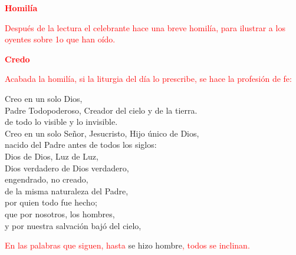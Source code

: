 \documentclass[12pt, letterpaper]{report}
\begin{document}
\Large {\bfseries \textcolor{red}{Homil\'ia}}

\large {\textcolor{red}{Despu\'es de la lectura el celebrante hace una breve homil\'ia, para ilustrar a los oyentes sobre 1o que han o\'ido.}}

\Large {\bfseries \textcolor{red}{Credo}}

\large {\textcolor{red}{Acabada la homil\'ia, si la liturgia del d\'ia lo prescribe, se hace la profesi\'on de fe:}}

\noindent
\Large {Creo en un solo Dios,\\
    Padre Todopoderoso, Creador del cielo y de la tierra.\\
    de todo lo visible y lo invisible.\\
    Creo en un solo Se\~nor, Jesucristo, Hijo \'unico de Dios,\\
    nacido del Padre antes de todos los siglos:\\
    Dios de Dios, Luz de Luz,\\
    Dios verdadero de Dios verdadero,\\
    engendrado, no creado,\\
    de la misma naturaleza del Padre,\\
    por quien todo fue hecho;\\
    que por nosotros, los hombres,\\
    y por nuestra salvaci\'on baj\'o del cielo,
}

\large {\textcolor{red}{En las palabras que siguen, hasta} se hizo hombre\textcolor{red}{, todos se inclinan.}}
\end{document}
